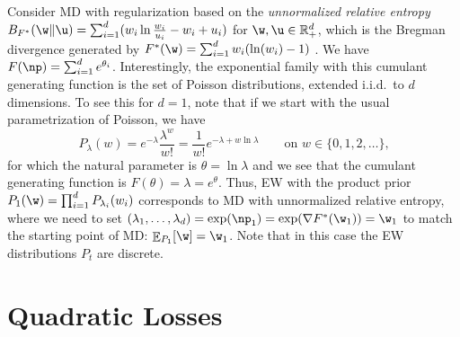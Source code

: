 \documentclass{colt2018} %
\DeclareMathOperator*{\E}{\mathbb{E}}
\newcommand{\reals}{\mathbb{R}}
\begin{document}
\begin{example}
Consider MD with regularization based on the
\emph{unnormalized relative entropy} $B_{F^*}(\w \| \u) = \sum_{i=1}^d
(w_i \ln \frac{w_i}{u_i} - w_i + u_i)$ for $\w,\u \in \reals_+^d$,
% 
% 
% 
% 
% 
which is the Bregman divergence generated by $F^*(\w) = \sum_{i=1}^d w_i
( \ln(w_i) - 1)$ \citep{CesaBianchiLugosi2006}. We have $F(\np) = \sum_{i=1}^d e^{\theta_i} $.
% 
% 
% 
% 
Interestingly, the exponential family with this cumulant generating
function is the set of Poisson distributions,
extended i.i.d.\ to $d$ dimensions. To see this for $d=1$, note that if
we start with the usual parametrization of Poisson, we have
\[
  P_\lambda(w) = e^{-\lambda} \frac{\lambda^w}{w!}
  = \frac{1}{w!} e^{-\lambda + w \ln \lambda}
  \qquad \text{on $w \in \{0,1,2,\ldots$\},}
\]
for which the natural parameter is $\theta = \ln \lambda$ and we see
that the cumulant generating function is $F(\theta) = \lambda =
e^{\theta}$. Thus, EW with the product prior $P_1(\w) = \prod_{i=1}^d
P_{\lambda_i}(w_i)$ corresponds to MD with unnormalized relative entropy, where we need to
set $(\lambda_1,\ldots,\lambda_d) = \exp(\np_1) = \exp(\nabla F^*(\w_1)) = \w_1$
% 
to match the starting point of MD: $\E_{P_1}[\w] = \w_1$. Note that in this case the EW distributions $P_t$ are discrete.
% 
% 
% 
% 
% 

% 
% 
% 
% 
% 
% 
% 
% 
% 
% 
% 


\end{example}

% 
% 
% 
% 
% 
% 
% 
% 
% 
% 
% 
% 
% 
% 
% 
% 
% 
% 
% 
% 
% 
% 
% 
% 
% 
% 
% 
% 
% 
% 
% 
% 
% 
% 
% 
% 
% 
% 
% 
% 
% 
% 
% 
% 
% 
% 
% 
% 
% 
% 
% 
% 

\section{Quadratic Losses}\label{sec:quadlosses}

% 
% 
% 
% 
% 
% 
% 
% 
% 
% 
% 
% 
% 
% 
% 
% 
\end{document}
